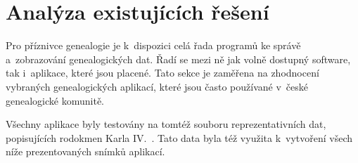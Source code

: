 		

\chapter{Analýza existujících řešení}
\label{chap:analyza}

	Pro příznivce genealogie je k~dispozici celá řada programů ke správě a~zobrazování genealogických dat. Řadí se mezi ně jak volně dostupný software, tak i~aplikace, které jsou placené. Tato sekce je zaměřena na zhodnocení vybraných genealogických aplikací, které jsou často používané v~české genealogické komunitě. \par
	Všechny aplikace byly testovány na tomtéž souboru reprezentativních dat, popisujících rodokmen Karla IV.~\cite{bib:ApliAnceHome}. Tato data byla též využita k~vytvoření všech níže prezentovaných snímků aplikací.\par

